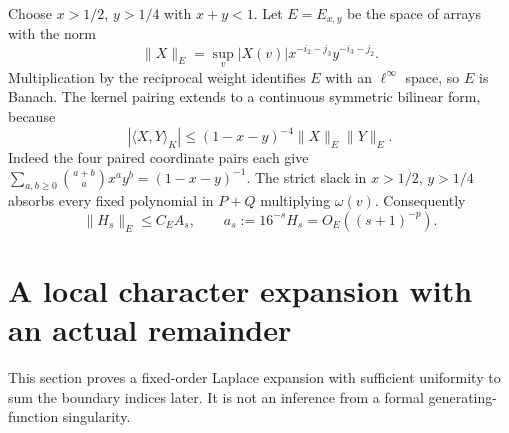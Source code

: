 \documentclass[11pt,letterpaper]{article}
\theoremstyle{remark}\newtheorem{remark}[theorem]{Remark}
\numberwithin{equation}{section}
\newcommand{\pair}[2]{\langle #1,#2\rangle_K}
\begin{document}
Choose $x>1/2$, $y>1/4$ with $x+y<1$. Let $E=E_{x,y}$ be the space
of arrays with the norm
\begin{equation}\label{upo:all5:eq:norm}
 \|X\|_E=\sup_v |X(v)|x^{-i_2-j_3}y^{-i_3-j_2}.
\end{equation}
Multiplication by the reciprocal weight identifies $E$ with an
$\ell^\infty$ space, so $E$ is Banach. The kernel pairing extends to a
continuous symmetric bilinear form, because
\begin{equation}\label{upo:all5:eq:pairbound}
 |\pair XY|\le(1-x-y)^{-4}\|X\|_E\|Y\|_E.
\end{equation}
Indeed the four paired coordinate pairs each give
$\sum_{a,b\ge0}\binom{a+b}{a}x^ay^b=(1-x-y)^{-1}$.
The strict slack in $x>1/2$, $y>1/4$ absorbs every fixed polynomial
in $P+Q$ multiplying $\omega(v)$. Consequently
\begin{equation}\label{upo:all5:eq:globalnorm}
 \|H_s\|_E\le C_E A_s,\qquad
 a_s:=16^{-s}H_s=O_E((s+1)^{-p}).
\end{equation}

\section{A local character expansion with an actual remainder}\label{upo:all5:sec:laplace}
This section proves a fixed-order Laplace expansion with sufficient
uniformity to sum the boundary indices later. It is not an inference
from a formal generating-function singularity.
\end{document}

